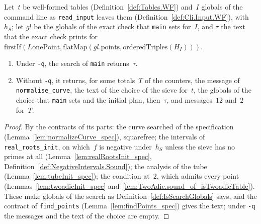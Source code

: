 \begin{lemma}\label{lem:Program.mainSearch_spec}
  \leanok
  Let~$t$ be well-formed tables (Definition~\ref{def:Tables.WF}) and~$I$ globals of the command line
  as \texttt{read\_input} leaves them (Definition~\ref{def:Cli.Input.WF}), with~$h_S$; let
  $\mathit{gl}$ be the globals of the exact check that \texttt{main} sets for~$I$, and $\tau$ the
  text that the exact check prints for $\mathrm{firstIf}(I.\mathrm{onePoint},
  \mathrm{flatMap}(\mathit{gl}.\mathrm{points}, \mathrm{orderedTriples}(H_I)))$.
  \begin{enumerate}
    \item Under \texttt{-q}, the search of \texttt{main} returns~$\tau$.
    \item Without \texttt{-q}, it returns, for some totals~$T$ of the counters, the message of
      \texttt{normalise\_curve}, the text of the choice of the sieve for~$t$, the globals of the
      choice that \texttt{main} sets and the initial plan, then~$\tau$, and messages~$12$ and~$2$
      for~$T$.
  \end{enumerate}
\end{lemma}

\begin{proof}
  \leanok
  By the contracts of its parts: the curve searched of the specification
  (Lemma~\ref{lem:normalizeCurve_spec}), squarefree; the intervals of \texttt{real\_roots\_init}, on
  which~$f$ is negative under~$h_S$ unless the sieve has no primes at all
  (Lemma~\ref{lem:realRootsInit_spec}, Definition~\ref{def:NegativeIntervals.Sound}); the analysis
  of the tube (Lemma~\ref{lem:tubeInit_spec}); the condition at~$2$, which admits every point
  (Lemmas~\ref{lem:twoadicInit_spec} and~\ref{lem:TwoAdic.sound_of_isTwoadicTable}). These make
  globals of the search as Definition~\ref{def:IsSearchGlobals} says, and the contract of
  \texttt{find\_points} (Lemma~\ref{lem:findPoints_spec}) gives the text; under \texttt{-q} the
  messages and the text of the choice are empty.
\end{proof}

